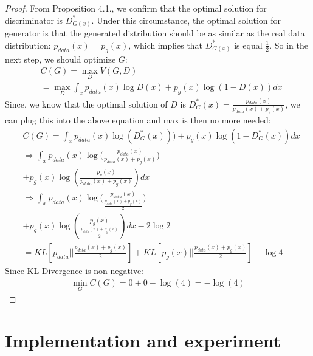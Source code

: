 \documentclass[10pt,twocolumn,letterpaper]{article}
\begin{document}
\begin{proof}
From Proposition 4.1., we confirm that the optimal solution for discriminator is $D_{G(x)}^*$. Under this circumstance, the optimal solution for generator is that the generated distribution should be as similar as the real data distribution: $p_{data}(x)=p_g(x)$, which implies that  $D_{G(x)}^*$ is equal $\frac{1}{2}$. So in the next step, we should optimize $G$:
\begin{align*}
    &C(G)=\max_DV(G, D)\\
    &=\max_D\int_xp_{data}(x)\log{D(x)} + p_g(x)\log{(1-D(x))}dx
\end{align*}
Since, we know that the optimal solution of $D$ is $ D_G^*(x) = \frac{p_{data}(x)}{p_{data}(x) + p_g(x)}$, we can plug this into the above equation and max is then no more needed:
\begin{align*}
    &C(G)=\int_xp_{data}(x)\log{(D_G^*(x))})+p_g(x)\log{(1-D_G^*(x))}dx    \\
    &\Longrightarrow\int_xp_{data}(x)\log{(\frac{p_{data}(x)}{p_{data}(x)+p_g(x)}})\\
    &+p_g(x)\log{(\frac{p_{g}(x)}{p_{data}(x)+p_g(x)})}dx\\
    &\Longrightarrow\int_xp_{data}(x)\log{(\frac{p_{data}(x)}{\frac{p_{data}(x)+p_g(x)}{2}}})\\
    &+p_g(x)\log{(\frac{p_{g}(x)}{\frac{p_{data}(x)+p_g(x)}{2}})}dx-2\log{2}\\
    &=KL[p_{data}||\frac{p_{data}(x)+p_g(x)}{2}] + KL[p_g(x)||\frac{p_{data}(x)+p_g(x)}{2}]-\log{4}
\end{align*}
Since KL-Divergence is non-negative\cite{bousquet2011advanced}:
\begin{align*}
    \min_GC(G) = 0 + 0 - \log(4) = -\log(4)
\end{align*}
\end{proof}

\section{Implementation and experiment}
\end{document}
